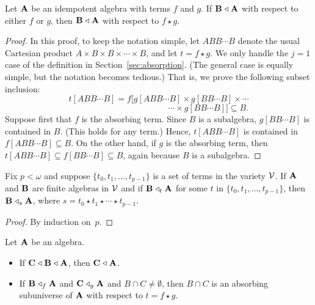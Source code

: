 \newcommand\sseq{\ensuremath{\subseteq}}
\begin{lemma}
\label{lem:fact1}
Let $\mathbf{A}$ be an idempotent algebra with terms $f$ and $g$. If
$\mathbf{B}\mathrel{\triangleleft} \mathbf{A}$ with respect to either $f$ or $g$, then
$\mathbf{B}\mathrel{\triangleleft} \mathbf{A}$ with respect to $f\star g$. 
\end{lemma}
\begin{proof}
In this proof, to keep the notation simple,
let $ABB\cdots B$ denote the usual Cartesian product 
$A\times B \times B \times \cdots \times B$, and
let $t=f\star g$.
We only handle the $j=1$ 
case of the definition in Section~\ref{sec:absorption}. 
(The general case is equally simple, but the notation becomes tedious.)
That is, we prove the following subset inclusion:
\[
t[ABB\cdots B]
= f\bigl[g[ABB\cdots B] \times 
g[BB\cdots B] \times \cdots
\]
\[\phantom{XXXXXXXXXXXXXX}\cdots \times
g[BB \cdots B]\bigr]\sseq B. 
\]
Suppose first that $f$ is the absorbing term. Since $B$ is a subalgebra,
$g[BB\cdots B]$ is contained in $B$. (This holds for any term.) Hence, 
$t[ABB\cdots B]$ is contained in $f[ABB\cdots B] \sseq B$. 
On the other hand, if $g$ is the absorbing term, then
$t[ABB \cdots B] \sseq f[BB \cdots B] \sseq B$, again because $B$ is a
subalgebra. 
\end{proof}
\begin{corollary}
  \label{cor:fact1gen}
  Fix $p <\omega$ and suppose $\{t_0, t_1, \dots, t_{p-1}\}$ is a set of terms in the variety $\mathcal{V}$.
  If $\mathbf{A}$ and $\mathbf{B}$ are finite algebras in $\mathcal{V}$ and if $\mathbf{B}\mathrel{\triangleleft}_{t} \mathbf{A}$ for some
  $t$ in $\{t_0, t_1, \dots, t_{p-1}\}$, then $\mathbf{B} \mathrel{\triangleleft}_s \mathbf{A}$, where 
  $s = t_0 \star t_1 \star \cdots \star t_{p-1}$.
\end{corollary}
\begin{proof}
  By induction on~$p$.
  \end{proof}

\begin{lemma} 
\label{lem:bk-prop-2-4}
  Let $\mathbf{A}$ be an algebra.
  \begin{itemize}
  \item If $\mathbf{C} \mathrel{\triangleleft} \mathbf{B} \mathrel{\triangleleft} \mathbf{A}$, then $\mathbf{C} \mathrel{\triangleleft} \mathbf{A}$.
  \item If $\mathbf{B} \mathrel{\triangleleft}_f \mathbf{A}$ and $\mathbf{C} \mathrel{\triangleleft}_g \mathbf{A}$ and $B \cap C\neq \emptyset$, then 
    $B \cap C$ is an absorbing subuniverse of $\mathbf{A}$ with respect to $t = f\star g$.
  \end{itemize}
\end{lemma}

